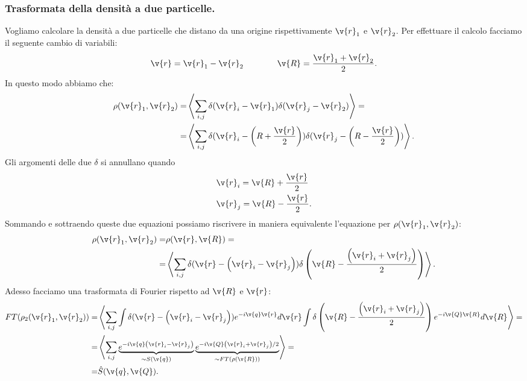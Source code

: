 \subsubsection{Trasformata della densità a due particelle.}
\label{subsubsec:Trasformata della densità a due particelle.}
Vogliamo calcolare la densità a due particelle che distano da una origine rispettivamente $\v{r}_1$ e $\v{r}_2$. Per effettuare il calcolo facciamo il seguente cambio di variabili:
\[\begin{aligned}
	&\v{r} = \v{r}_1-\v{r}_2 &&&&&&
	&\v{R} = \frac{\v{r}_1 + \v{r}_2}{2}
.\end{aligned}\]
In questo modo abbiamo che:
\[\begin{aligned}
	\rho (\v{r}_1,\v{r}_2) 
	=&
	\left<\sum_{i,j}^{} \delta(\v{r}_i - \v{r}_1)\delta(\v{r}_j - \v{r}_2) \right> =\\
	=&
	\left<\sum_{i,j}^{} \delta(\v{r}_i - \left( R + \frac{\v{r}}{2} \right) )\delta(\v{r}_j - \left( R - \frac{\v{r}}{2} \right)) \right> 
.\end{aligned}\]
Gli argomenti delle due $\delta$ si annullano quando
\[\begin{aligned}
	& \v{r}_i = \v{R}+\frac{\v{r}}{2}\\
	&\v{r}_j = \v{R}- \frac{\v{r}}{2}
.\end{aligned}\]
Sommando e sottraendo queste due equazioni possiamo riscrivere in maniera equivalente l'equazione per $\rho (\v{r}_1,\v{r}_2)$:
\[\begin{aligned}
	\rho (\v{r}_1, \v{r}_2) = &
	\rho (\v{r},\v{R}) =\\
	=&
	\left< \sum_{i,j}^{} \delta(\v{r}-\left( \v{r}_i-\v{r}_j \right))\delta\left(  \v{R}- \frac{\left( \v{r}_i + \v{r}_j \right) }{2} \right)  \right>
.\end{aligned}\]
Adesso facciamo una trasformata di Fourier rispetto ad $\v{R}$ e $\v{r}$:
\[\begin{aligned}
	FT(\rho_2 (\v{r}_1,\v{r}_2)) =&
	\left<\sum_{i,j}^{} \int \delta(\v{r} - \left( \v{r}_i -\v{r}_j \right) )e^{-i \v{q}\v{r}}d \v{r} 
	\int \delta \left( \v{R} - \frac{\left( \v{r}_i +\v{r}_j \right)}{2}  \right) e^{-i \v{Q}\v{R}}d \v{R} \right> =\\
	=&
	\left<\sum_{i,j}^{} 
	\underbrace{
	e^{-i \v{q}\left( \v{r}_i - \v{r}_j \right) } 
	}_{\sim S(\v{q})}
	\underbrace{
	e^{-i \v{Q}\left( \v{r}_i + \v{r}_j \right)/2 }
	}_{\sim FT(\rho (\v{R}))}
	\right>=\\
	=& \hat{S}(\v{q},\v{Q})
.\end{aligned}\]
